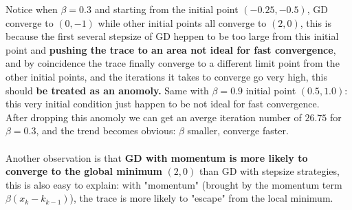 \documentclass{article}
\begin{document}
Notice when $\beta = 0.3$ and starting from the initial point $(-0.25,-0.5)$, GD converge to $(0,-1)$ while other initial points all converge to $(2,0)$, this is because the first several stepsize of GD heppen to be too large from this initial point and \textbf{pushing the trace to an area not ideal for fast convergence}, and by coincidence the trace finally converge to a different limit point from the other initial points, and the iterations it takes to converge go very high, this should \textbf{be treated as an anomoly.} Same with $\beta = 0.9$ initial point $(0.5,1.0)$: this very initial condition just happen to be not ideal for fast convergence.\\
After dropping this anomoly we can get an averge iteration number of $26.75$ for $\beta = 0.3$, and the trend becomes obvious: $\beta$ smaller, converge faster. \\
\\
Another observation is that \textbf{GD with momentum is more likely to converge to the global minimum} $(2,0)$ than GD with stepsize strategies, this is also easy to explain: with "momentum" (brought by the momentum term $\beta (x_k-k_{k-1})$), the trace is more likely to "escape" from the local minimum.
\newpage
\end{document}
